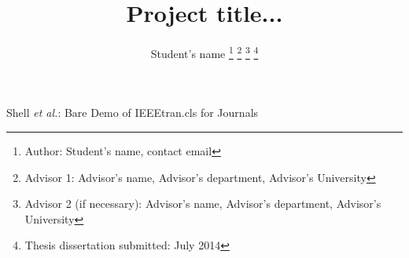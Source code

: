 \documentclass[journal,onecolumn]{IEEEtran}
\begin{document}
%
\title{Project title...}
%
%
%

\author{ Student's name%
\thanks{Author: Student's name, contact email}%
\thanks{Advisor 1: Advisor's name,  Advisor's department,  Advisor's University }%
\thanks{Advisor 2 (if necessary): Advisor's name,  Advisor's department,  Advisor's University }%
\thanks{Thesis dissertation submitted: July 2014}}

% 
%



%
{Shell \MakeLowercase{\textit{et al.}}: Bare Demo of IEEEtran.cls for Journals}
% 
\end{document}
